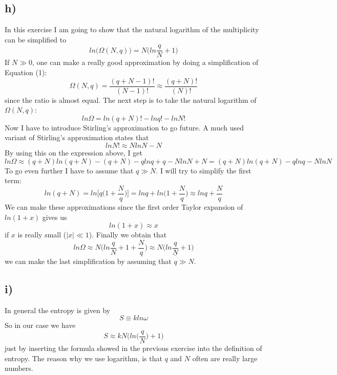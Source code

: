 \documentclass{scrartcl}
\begin{document}
\subsection*{h)}
In this exercise I am going to show that the natural logarithm of the multiplicity can be simplified to
$$ln\Big(\Omega(N,q)\Big)=N\bigg(ln\frac{q}{N}+1\bigg)$$
If $N\gg 0$, one can make a really good approximation by doing a simplification of Equation (1):
$$\Omega(N,q)=\frac{(q+N-1)!}{(N-1)!}\approx\frac{(q+N)!}{(N)!}$$
since the ratio is almost equal. The next step is to take the natural logarithm of $\Omega(N,q)$:  
$$ln\Omega=ln (q+N)!-ln q!-ln N!$$
Now I have to introduce Stirling's approximation to go future. A much used variant of Stirling's approximation states that
\begin{equation}
ln N!\approx Nln N-N
\end{equation}
By using this on the expression above, I get
$$ln \Omega\approx(q+N)ln (q+N)-(q+N)-qln q+q-Nln N+N=(q+N)ln (q+N)-qln q-Nln N$$
To go even further I have to assume that $q\gg N$. I will try to simplify the first term:
$$ln(q+N)=ln\Bigg[q\bigg(1+\frac{N}{q}\bigg)\Bigg]=ln q+ln\bigg(1+\frac{N}{q}\bigg)\approx ln q+\frac{N}{q}$$
We can make these approximations since the first order Taylor expansion of $ln(1+x)$ gives us 
\begin{equation}
ln(1+x)\approx x
\end{equation}
if $x$ is really small ($|x|\ll 1$). Finally we obtain that
$$ln \Omega \approx N\bigg(ln \frac{q}{N} + 1 + \frac{N}{q}\bigg) \approx \underline{N\bigg(ln \frac{q}{N} + 1\bigg)}$$
we can make the last simplification by assuming that $q\gg N$.

\subsection*{i)}
In general the entropy is given by 
\begin{equation}
S\equiv k ln\omega
\end{equation}
So in our case we have
$$S\approx kN\bigg(ln\Big(\frac{q}{N}\Big)+1\bigg)$$
just by inserting the formula showed in the previous exercise into the definition of entropy.
The reason why we use logarithm, is that $q$ and $N$ often are really large numbers.
\end{document}
